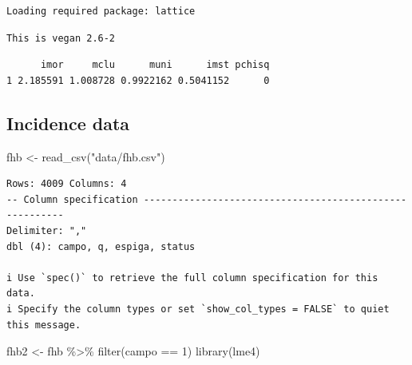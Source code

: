 \documentclass[
  letterpaper,
  DIV=11,
  numbers=noendperiod]{scrreprt}
\newenvironment{Shaded}{\begin{snugshade}}{\end{snugshade}}
\newcommand{\DecValTok}[1]{\textcolor[rgb]{0.68,0.00,0.00}{#1}}
\newcommand{\FunctionTok}[1]{\textcolor[rgb]{0.28,0.35,0.67}{#1}}
\newcommand{\NormalTok}[1]{\textcolor[rgb]{0.00,0.23,0.31}{#1}}
\newcommand{\OtherTok}[1]{\textcolor[rgb]{0.00,0.23,0.31}{#1}}
\newcommand{\SpecialCharTok}[1]{\textcolor[rgb]{0.37,0.37,0.37}{#1}}
\newcommand{\StringTok}[1]{\textcolor[rgb]{0.13,0.47,0.30}{#1}}
\begin{document}
\begin{verbatim}
Loading required package: lattice
\end{verbatim}

\begin{verbatim}
This is vegan 2.6-2
\end{verbatim}

\begin{Shaded}
\end{Shaded}

\begin{verbatim}
      imor     mclu      muni      imst pchisq
1 2.185591 1.008728 0.9922162 0.5041152      0
\end{verbatim}

\hypertarget{incidence-data}{%
\subsection{Incidence data}\label{incidence-data}}

\begin{Shaded}
\begin{Highlighting}[]
\NormalTok{fhb }\OtherTok{\textless{}{-}} \FunctionTok{read\_csv}\NormalTok{(}\StringTok{"data/fhb.csv"}\NormalTok{)}
\end{Highlighting}
\end{Shaded}

\begin{verbatim}
Rows: 4009 Columns: 4
-- Column specification --------------------------------------------------------
Delimiter: ","
dbl (4): campo, q, espiga, status

i Use `spec()` to retrieve the full column specification for this data.
i Specify the column types or set `show_col_types = FALSE` to quiet this message.
\end{verbatim}

\begin{Shaded}
\begin{Highlighting}[]
\NormalTok{fhb2 }\OtherTok{\textless{}{-}}\NormalTok{ fhb }\SpecialCharTok{\%\textgreater{}\%}
  \FunctionTok{filter}\NormalTok{(campo }\SpecialCharTok{==} \DecValTok{1}\NormalTok{) }
\FunctionTok{library}\NormalTok{(lme4)}
\end{Highlighting}
\end{Shaded}
\end{document}
